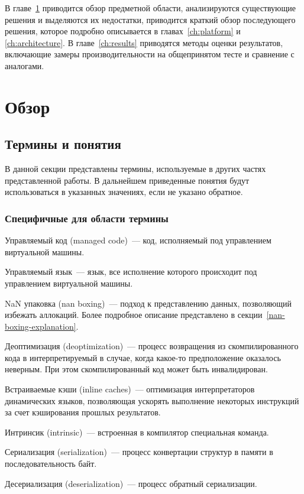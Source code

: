 \documentclass[times
]{itmo-student-thesis}
\begin{document}
В главе~\ref{ch:overview} приводится обзор предметной области, анализируются существующие решения и выделяются их недостатки, приводится краткий обзор последующего решения, которое подробно описывается в главах~\ref{ch:platform} и \ref{ch:architecture}. В главе~\ref{ch:results} приводятся методы оценки результатов, включающие замеры производительности на общепринятом тесте и сравнение с аналогами.

\chapter{Обзор}\label{ch:overview}

\startrelatedwork

\section{Термины и понятия}
В данной секции представлены термины, используемые в других частях представленной работы. В дальнейшем приведенные понятия будут использоваться в указанных значениях, если не указано обратное.
\def\MakeTerm#1#2{#1~--- #2.\par}
\subsection{Специфичные для области термины}
	\MakeTerm{Управляемый код (managed code)}{код, исполняемый под управлением виртуальной машины}
	\MakeTerm{Управляемый язык}{язык, все исполнение которого происходит под управлением виртуальной машины}
	\MakeTerm{NaN упаковка (nan boxing)}{подход к представлению данных, позволяющий избежать аллокаций. Более подробное описание представлено в секции~\ref{nan-boxing-explanation}}
	\MakeTerm{Деоптимизация (deoptimization)}{процесс возвращения из скомпилированного кода в интерпретируемый в случае, когда какое-то предположение оказалось неверным. При этом скомпилированный код может быть инвалидирован}
	\MakeTerm{Встраиваемые кэши (inline caches)}{оптимизация интерпретаторов динамических языков, позволяющая ускорять выполнение некоторых инструкций за счет кэширования прошлых результатов}
	\MakeTerm{Интринсик (intrinsic)}{встроенная в компилятор специальная команда}
	\MakeTerm{Сериализация (serialization)}{процесс конвертации структур в памяти в последовательность байт}
	\MakeTerm{Десериализация (deserialization)}{процесс обратный сериализации}
\end{document}
